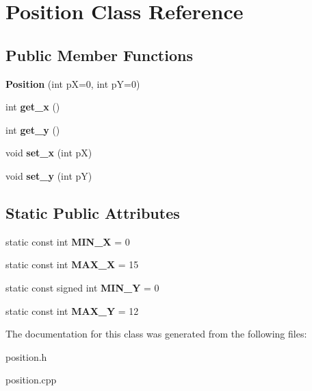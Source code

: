 \hypertarget{classPosition}{}\section{Position Class Reference}
\label{classPosition}
\subsection*{Public Member Functions}
\begin{DoxyCompactItemize}
\item 
\mbox{\label{classPosition_a64613990b7f8a086d80278ac31c71e66}} 
{\bfseries Position} (int pX=0, int pY=0)
\item 
\mbox{\label{classPosition_a0771e8ede27465f7d038aa5af39f7206}} 
int {\bfseries get\+\_\+x} ()
\item 
\mbox{\label{classPosition_ae91aa6b1fb3aa3afa1cb5b3376f993a0}} 
int {\bfseries get\+\_\+y} ()
\item 
\mbox{\label{classPosition_a4ad5c218e840f8e2c77fa7fbb52acb5e}} 
void {\bfseries set\+\_\+x} (int pX)
\item 
\mbox{\label{classPosition_a523ae78b7f6930d38bd7f07b9af28c23}} 
void {\bfseries set\+\_\+y} (int pY)
\end{DoxyCompactItemize}
\subsection*{Static Public Attributes}
\begin{DoxyCompactItemize}
\item 
\mbox{\label{classPosition_ae29edb75bed882fdc7266b9a166a3b84}} 
static const int {\bfseries M\+I\+N\+\_\+X} = 0
\item 
\mbox{\label{classPosition_aeea7c7673d468360b9df32dd802fdbc7}} 
static const int {\bfseries M\+A\+X\+\_\+X} = 15
\item 
\mbox{\label{classPosition_afb5e31668c837c89da0f93f36c1b8284}} 
static const signed int {\bfseries M\+I\+N\+\_\+Y} = 0
\item 
\mbox{\label{classPosition_a96db3b939dd9af39ce645d642f9870a1}} 
static const int {\bfseries M\+A\+X\+\_\+Y} = 12
\end{DoxyCompactItemize}


The documentation for this class was generated from the following files\+:\begin{DoxyCompactItemize}
\item 
position.\+h\item 
position.\+cpp\end{DoxyCompactItemize}
